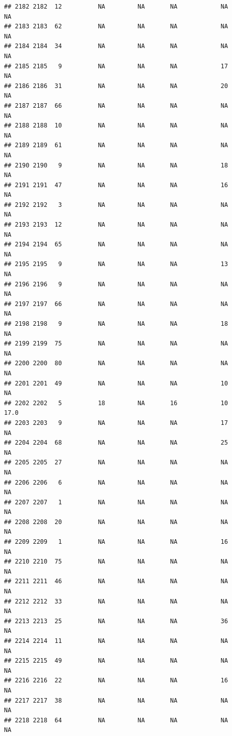 \documentclass[man]{apa6}
\begin{document}
\begin{verbatim}
## 2182 2182  12          NA         NA       NA            NA       NA
## 2183 2183  62          NA         NA       NA            NA       NA
## 2184 2184  34          NA         NA       NA            NA       NA
## 2185 2185   9          NA         NA       NA            17       NA
## 2186 2186  31          NA         NA       NA            20       NA
## 2187 2187  66          NA         NA       NA            NA       NA
## 2188 2188  10          NA         NA       NA            NA       NA
## 2189 2189  61          NA         NA       NA            NA       NA
## 2190 2190   9          NA         NA       NA            18       NA
## 2191 2191  47          NA         NA       NA            16       NA
## 2192 2192   3          NA         NA       NA            NA       NA
## 2193 2193  12          NA         NA       NA            NA       NA
## 2194 2194  65          NA         NA       NA            NA       NA
## 2195 2195   9          NA         NA       NA            13       NA
## 2196 2196   9          NA         NA       NA            NA       NA
## 2197 2197  66          NA         NA       NA            NA       NA
## 2198 2198   9          NA         NA       NA            18       NA
## 2199 2199  75          NA         NA       NA            NA       NA
## 2200 2200  80          NA         NA       NA            NA       NA
## 2201 2201  49          NA         NA       NA            10       NA
## 2202 2202   5          18         NA       16            10     17.0
## 2203 2203   9          NA         NA       NA            17       NA
## 2204 2204  68          NA         NA       NA            25       NA
## 2205 2205  27          NA         NA       NA            NA       NA
## 2206 2206   6          NA         NA       NA            NA       NA
## 2207 2207   1          NA         NA       NA            NA       NA
## 2208 2208  20          NA         NA       NA            NA       NA
## 2209 2209   1          NA         NA       NA            16       NA
## 2210 2210  75          NA         NA       NA            NA       NA
## 2211 2211  46          NA         NA       NA            NA       NA
## 2212 2212  33          NA         NA       NA            NA       NA
## 2213 2213  25          NA         NA       NA            36       NA
## 2214 2214  11          NA         NA       NA            NA       NA
## 2215 2215  49          NA         NA       NA            NA       NA
## 2216 2216  22          NA         NA       NA            16       NA
## 2217 2217  38          NA         NA       NA            NA       NA
## 2218 2218  64          NA         NA       NA            NA       NA

\end{verbatim}
\end{document}

